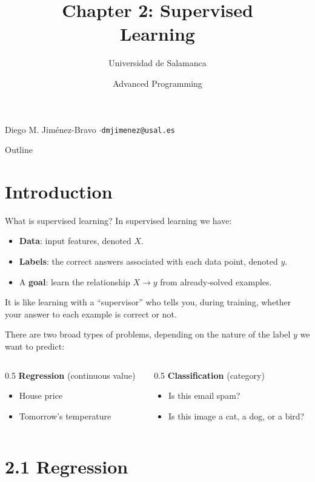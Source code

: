 \documentclass[aspectratio=169]{beamer}
\title[2. Supervised Learning]{Chapter 2: Supervised\\Learning}
\author{Universidad de Salamanca}
\institute{Faculty of Sciences}
\date{Advanced Programming}
\makeatletter
\newcommand{\titleslide}{%
\begin{frame}
  \titlepage
  \vspace{-0.5em}
  {\footnotesize Diego M. Jiménez-Bravo \quad$\cdot$\quad \texttt{dmjimenez@usal.es}}
\end{frame}
}
\makeatother
\begin{document}
\titleslide

\begin{frame}{Outline}
  \tableofcontents
\end{frame}

\section{Introduction}

\begin{frame}{What is supervised learning?}
  In supervised learning we have:
  \begin{itemize}
    \item \textbf{Data}: input features, denoted $X$.
    \item \textbf{Labels}: the correct answers associated with each data point, denoted $y$.
    \item A \textbf{goal}: learn the relationship $X \rightarrow y$ from already-solved examples.
  \end{itemize}
  It is like learning with a ``supervisor'' who tells you, during training, whether your answer to each example is correct or not.

  There are two broad types of problems, depending on the nature of the label $y$ we want to predict:
  \begin{columns}
    \begin{column}{0.5\textwidth}
      \textbf{Regression} (continuous value)
      \begin{itemize}
        \small
        \item House price
        \item Tomorrow's temperature
      \end{itemize}
    \end{column}
    \begin{column}{0.5\textwidth}
      \textbf{Classification} (category)
      \begin{itemize}
        \small
        \item Is this email spam?
        \item Is this image a cat, a dog, or a bird?
      \end{itemize}
    \end{column}
  \end{columns}
\end{frame}

\section{2.1 Regression}
\end{document}
